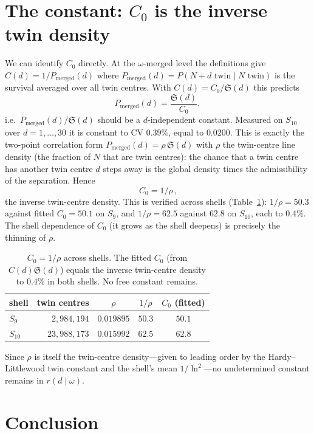 \documentclass[11pt]{article}
\begin{document}
\section{The constant: $C_0$ is the inverse twin density}

We can identify $C_0$ directly. At the $\omega$-merged level the definitions give
$C(d)=1/P_{\mathrm{merged}}(d)$ where $P_{\mathrm{merged}}(d)=P(N{+}d\text{ twin}
\mid N\text{ twin})$ is the survival averaged over all twin centres. With
$C(d)=C_0/\mathfrak{S}(d)$ this predicts
\[
  P_{\mathrm{merged}}(d)=\frac{\mathfrak{S}(d)}{C_0},
\]
i.e.\ $P_{\mathrm{merged}}(d)/\mathfrak{S}(d)$ should be a $d$-independent
constant. Measured on $S_{10}$ over $d=1,\dots,30$ it is constant to CV $0.39\%$,
equal to $0.0200$. This is exactly the two-point correlation form
$P_{\mathrm{merged}}(d)=\rho\,\mathfrak{S}(d)$ with $\rho$ the twin-centre line
density (the fraction of $N$ that are twin centres): the chance that a twin centre
has another twin centre $d$ steps away is the global density times the
admissibility of the separation. Hence
\[
  \boxed{\,C_0=1/\rho\,},
\]
the inverse twin-centre density. This is verified across shells
(Table~\ref{tab:c0}): $1/\rho=50.3$ against fitted $C_0=50.1$ on $S_9$, and
$1/\rho=62.5$ against $62.8$ on $S_{10}$, each to $0.4\%$. The shell dependence of
$C_0$ (it grows as the shell deepens) is precisely the thinning of $\rho$.

\begin{table}[h]\centering
\begin{tabular}{lrccc}
\toprule
shell & twin centres & $\rho$ & $1/\rho$ & $C_0$ (fitted)\\
\midrule
$S_9$  & $2{,}984{,}194$  & $0.019895$ & $50.3$ & $50.1$\\
$S_{10}$ & $23{,}988{,}173$ & $0.015992$ & $62.5$ & $62.8$\\
\bottomrule
\end{tabular}
\caption{$C_0=1/\rho$ across shells. The fitted $C_0$ (from
$C(d)\mathfrak{S}(d)$) equals the inverse twin-centre density to $0.4\%$ in both
shells. No free constant remains.}
\label{tab:c0}
\end{table}

Since $\rho$ is itself the twin-centre density---given to leading order by the
Hardy--Littlewood twin constant and the shell's mean $1/\ln^2$---no undetermined
constant remains in $r(d\mid\omega)$.

\section{Conclusion}
\end{document}
